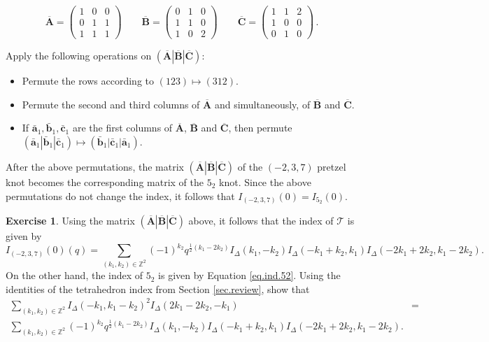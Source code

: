 \documentclass[12pt]{amsart}
\theoremstyle{definition}
\newtheorem{exercise}[thm]{Exercise}
\theoremstyle{remark}
\def\BZ{\mathbb Z}
\def\lbl{\label}
\newcommand{\CT}{\mathcal{T}}
\def\ID{I_{\Delta}}
\newcommand{\mb}{\mathbf}
\begin{document}
$$
\overline{\mb A} =
\left(
\begin{array}{ccc}
 1 & 0 & 0 \\
 0 & 1 & 1 \\
 1 & 1 & 1
\end{array}
\right)
\qquad
\overline{\mb B} =
\left(
\begin{array}{ccc}
 0 & 1 & 0 \\
 1 & 1 & 0 \\
 1 & 0 & 2 
\end{array}
\right)
\qquad
\overline{\mb C} =
\left(
\begin{array}{ccc}
 1 & 1 & 2 \\
 1 & 0 & 0 \\
 0 & 1 & 0
\end{array}
\right) \, .
$$

Apply the following operations on $(\overline{\mb A}|\overline{\mb B}|\overline{\mb C})$:
\begin{itemize}
\item
Permute the rows according to $(123) \mapsto (312)$.
\item
Permute the second and third columns of $\overline{\mb A}$ and simultaneously, of
 $\overline{\mb B}$ and  $\overline{\mb C}$.
\item
If $\bar{\boldsymbol a}_1, \bar{\boldsymbol b}_1, \bar{\boldsymbol c}_1$ are the first columns of $\overline{\mb A}$,  $\overline{\mb B}$ and  $\overline{\mb C}$,
then permute $(\bar{\boldsymbol a}_1| \bar{\boldsymbol b}_1 | \bar{\boldsymbol c}_1)\mapsto 
(\bar{\boldsymbol b}_1| \bar{\boldsymbol c}_1 | \bar{\boldsymbol a}_1)$.
\end{itemize}
After the above permutations, the matrix $(\overline{\mb A}|\overline{\mb B}|\overline{\mb C})$ of the $(-2,3,7)$ 
pretzel knot becomes the corresponding matrix of the $5_2$ knot. Since
the above permutations do not change the index, it follows that
$I_{(-2,3,7)}(0)=I_{5_2}(0)$.

\begin{exercise}
\lbl{exerc.237} 
Using the matrix $(\overline{\mb A}|\overline{\mb B}|\overline{\mb C})$ above, it follows that
the index of $\CT$ is given by
\begin{equation}
\lbl{eq.ind.237}
I_{(-2,3,7)}(0)(q)=\sum_{(k_1,k_2) \in \BZ^2} 
(-1)^{k_2} q^{\frac{1}{2} (k_1 - 2 k_2)}
\ID(k_1, -k_2) \ID(-k_1 + k_2, k_1) \ID(-2 k_1 + 2 k_2, k_1 - 2 k_2).
\end{equation}
On the other hand, the index of $5_2$ is given by Equation \eqref{eq.ind.52}.
Using the identities of the tetrahedron index from Section \ref{sec.review},
show that
\begin{align*}
\sum_{(k_1,k_2) \in \BZ^2} \ID(-k_1,k_1-k_2)^2 \ID(2 k_1-2 k_2,-k_1)
&= \\
\sum_{(k_1,k_2) \in \BZ^2} 
(-1)^{k_2} q^{\frac{1}{2} (k_1 - 2 k_2)}
  \ID(k_1, -k_2) \ID(-k_1 + k_2, k_1) \ID(-2 k_1 + 2 k_2, k_1 - 2 k_2). &
\end{align*}
\end{exercise}
\end{document}
